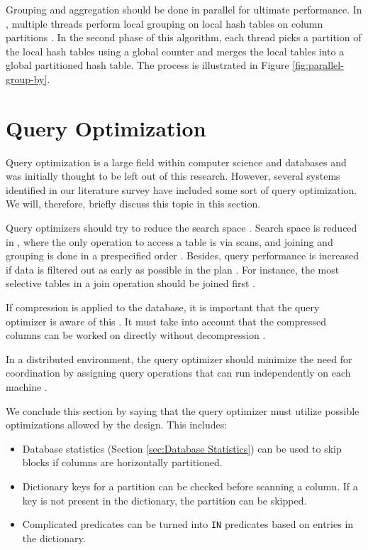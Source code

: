 Grouping and aggregation should be done in parallel for ultimate performance. In \ibm, multiple threads perform local grouping on local hash tables on column partitions \cite{Raman2013-em}. In the second phase of this algorithm, each thread picks a partition of the local hash tables using a global counter and merges the local tables into a global partitioned hash table. The process is illustrated in Figure \ref{fig:parallel-group-by}.


\section{Query Optimization}
\label{sec:Query Optimization}
Query optimization is a large field within computer science and databases and was initially thought to be left out of this research. However, several systems identified in our literature survey have included some sort of query optimization. We will, therefore, briefly discuss this topic in this section. 

Query optimizers should try to reduce the search space \cite{Boncz2002-yj, Stonebraker2005-qz}. Search space is reduced in \blink, where the only operation to access a table is via scans, and joining and grouping is done in a prespecified order \cite{Barber2012-xt}. Besides, query performance is increased if data is filtered out as early as possible in the plan \cite{Lamb2012-kg}. For instance, the most selective tables in a join operation should be joined first \cite{Holloway2008-rr}.

If compression is applied to the database, it is important that the query optimizer is aware of this \cite{Westmann2000-mz}. It must take into account that the compressed columns can be worked on directly without decompression \cite{Stonebraker2005-qz}.

In a distributed environment, the query optimizer should minimize the need for coordination by assigning query operations that can run independently on each machine \cite{Exasol2014-xh}. 

We conclude this section by saying that the query optimizer must utilize possible optimizations allowed by the design. This includes:
\begin{itemize}
  \item Database statistics (Section \ref{sec:Database Statistics}) can be used to skip blocks if columns are horizontally partitioned.
  \item Dictionary keys for a partition can be checked before scanning a column. If a key is not present in the dictionary, the partition can be skipped.
  \item Complicated predicates can be turned into \texttt{IN} predicates based on entries in the dictionary.
\end{itemize}

